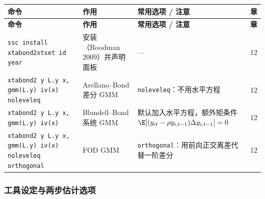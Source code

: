 {\renewcommand{\arraystretch}{1.12}\begin{longtable}{@{}>{\raggedright\arraybackslash\small}p{5.3cm}>{\raggedright\arraybackslash\small}p{3.8cm}>{\raggedright\arraybackslash\small}p{5.3cm}>{\centering\arraybackslash\small}p{0.9cm}@{}}
\toprule
\textbf{命令} & \textbf{作用} & \textbf{常用选项 / 注意} & \textbf{章}\\
\midrule
\endfirsthead
\toprule
\textbf{命令} & \textbf{作用} & \textbf{常用选项 / 注意} & \textbf{章}\\
\midrule
\endhead
\bottomrule
\endlastfoot

\texttt{ssc install xtabond2}\newline \texttt{xtset id year} & 安装（Roodman 2009）并声明面板 & — & 12\\
\addlinespace[1pt]
\texttt{xtabond2 y L.y x, gmm(L.y) iv(x) noleveleq}\newline {\footnotesize\rmfamily [SSC]} & Arellano–Bond 差分 GMM & \texttt{noleveleq}：不用水平方程 & 12\\
\addlinespace[1pt]
\texttt{xtabond2 y L.y x, gmm(L.y) iv(x)} & Blundell–Bond 系统 GMM & 默认加入水平方程，额外矩条件 $\E[(y_{it}-\rho y_{i,t-1})\Delta y_{i,t-1}]=0$ & 12\\
\addlinespace[1pt]
\texttt{xtabond2 y L.y x, gmm(L.y) iv(x) noleveleq orthogonal} & FOD GMM & \texttt{orthogonal}：用前向正交离差代替一阶差分 & 12\\
\end{longtable}}


\subsubsection{工具设定与两步估计选项}

